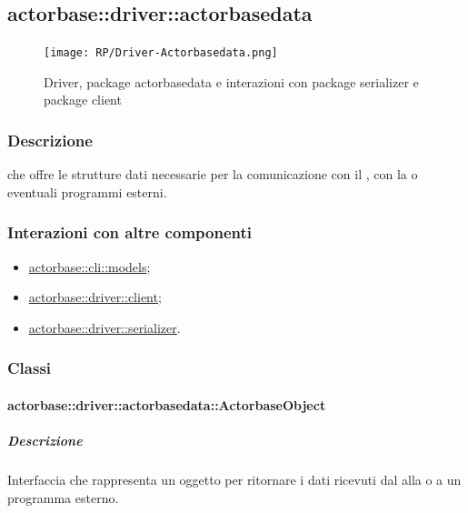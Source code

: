 \documentclass{scalatekids-article}
\begin{document}
\subsection{actorbase::driver::actorbasedata}
\label{sec:actorbase::driver::actorbasedata}

\begin{figure}[H]
  \begin{center}
    \texttt{[image: RP/Driver-Actorbasedata.png]}
    \caption{Driver, package actorbasedata e interazioni con package serializer e package client}
  \end{center}
\end{figure}

\subsubsection{Descrizione}

 che offre le strutture dati necessarie per la comunicazione
con il , con la  o eventuali programmi esterni.

\subsubsection{Interazioni con altre componenti}
\begin{itemize}
\item \hyperref[sec:actorbase::cli::models]{actorbase::cli::models};
\item \hyperref[sec:actorbase::driver::client]{actorbase::driver::client};
\item \hyperref[sec:actorbase::driver::serializer]{actorbase::driver::serializer}.
\end{itemize}

\subsubsection{Classi}

\paragraph{actorbase::driver::actorbasedata::ActorbaseObject}
\label{sec:actorbase::driver::actorbasedata::ActorbaseObject}

\subparagraph{Descrizione}

Interfaccia che rappresenta un oggetto per ritornare i dati
ricevuti dal  alla  o a un programma esterno.
\end{document}
